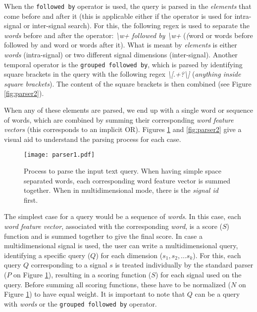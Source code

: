 \par
When the \texttt{followed by} operator is used, the query is parsed in the \textit{elements} that come before and after it (this is applicable either if the operator is used for intra-signal or inter-signal search). For this, the following \gls{regex} is used to separate the \textit{words} before and after the operator: \textit{\textbackslash w+ followed by \textbackslash w+} (\textit(word or words before followed by and word or words after it). What is meant by \textit{elements} is either \textit{words} (intra-signal) or two different signal dimensions (inter-signal). Another temporal operator is the \texttt{grouped followed by}, which is parsed by identifying square brackets in the query with the following \gls{regex} \textit{\textbackslash[.+?\textbackslash]} (\textit{anything inside square brackets}). The content of the square brackets is then combined (see Figure \ref{fig:parser2}).
\par
When any of these elements are parsed, we end up with a single word or sequence of words, which are combined by summing their corresponding \textit{word feature vectors} (this corresponds to an implicit OR). Figures \ref{fig:parser1} and \ref{fig:parser2} give a visual aid to understand the parsing process for each case.

\begin{figure}
\centering
\texttt{[image: parser1.pdf]}
\caption{Process to parse the input text query. When having simple space separated words, each corresponding word feature vector is summed together. When in multidimensional mode, there is the \textit{signal id} first.}
\label{fig:parser1}
\end{figure}

The simplest case for a query would be a sequence of \textit{words}. In this case, each \textit{word feature vector},  associated with the corresponding \textit{word}, is a score ($S$) function and is summed together to give the final score. In case a multidimensional signal is used, the user can write a multidimensional query, identifying a specific query ($Q$) for each dimension ($s_1, s_2,...s_k$). For this, each query $Q$ corresponding to a signal $s$ is treated individually by the standard parser ($P$ on Figure \ref{fig:parser1}), resulting in a scoring function ($S$) for each signal used on the query. Before summing all scoring functions, these have to be normalized ($N$ on Figure \ref{fig:parser1}) to have equal weight. It is important to note that $Q$ can be a query with \textit{words} or the \texttt{grouped followed by} operator.

